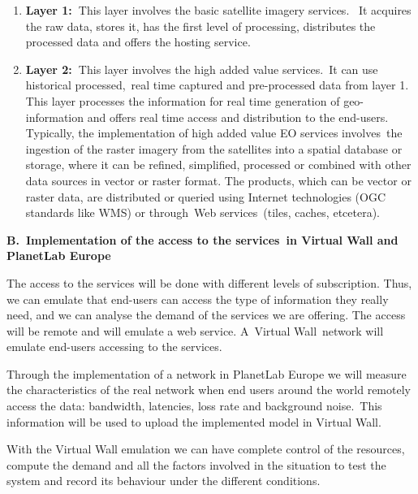 \documentclass[a4paper]{article}
\newcounter{saveenum}
\newcommand\liststyleLFOx{%
\renewcommand\theenumi{\alph{enumi}}
\renewcommand\theenumii{\alph{enumii}}
\renewcommand\theenumiii{\roman{enumiii}}
\renewcommand\theenumiv{\arabic{enumiv}}
\renewcommand\labelenumi{\theenumi)}
\renewcommand\labelenumii{\theenumii.}
\renewcommand\labelenumiii{\theenumiii.}
\renewcommand\labelenumiv{\theenumiv.}
}
\begin{document}
\liststyleLFOx
\setcounter{saveenum}{\value{enumi}}
\begin{enumerate}
\setcounter{enumi}{\value{saveenum}}
\item \textbf{Layer 1}\textbf{:\ }This layer involves the basic
satellite imagery services. \ It acquires the raw data, stores it, has
the first level of processing, distributes the processed data and
offers the hosting service.\ 
\item \textbf{Layer 2:\ }This layer involves the high added value
services.\ It can use historical processed,\ real time captured and
pre-processed data from layer 1. This layer processes the information
for real time generation of geo-information and offers real time access
and distribution to the end-users. Typically, the implementation of
high added value EO services involves\ the ingestion of the raster
imagery from the satellites into a spatial database or storage, where
it can be refined, simplified, processed or combined with other data
sources in vector or raster format. The products, which can be vector
or raster data, are distributed or queried using Internet technologies
(OGC standards like WMS) or through\ Web services\ (tiles, caches,
etcetera).\ 
\end{enumerate}
\textbf{B.\ }\textbf{Implementation of the a}\textbf{ccess to the
services}\textbf{\ in Virtual Wall and PlanetLab Europe}\ 

The access to the services will be done with different levels of
subscription. Thus, we can emulate that end-users can access the type
of information they really need, and we can analyse the demand of the
services we are offering. The access will be remote and will emulate a
web service. A\ Virtual Wall\ network will emulate end-users accessing
to the services.


\bigskip

Through the implementation of a network in PlanetLab Europe we will
measure the characteristics of the real network when end users around
the world remotely access the data: bandwidth, latencies, loss rate and
background noise.\ This information will be used to upload the
implemented model in Virtual Wall.\ 


\bigskip

With the Virtual Wall emulation we can have complete control of the
resources, compute the demand and all the factors involved in the
situation to test the system and record its behaviour under the
different conditions.


\bigskip
\end{document}
